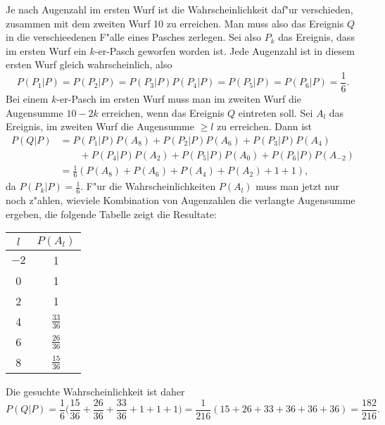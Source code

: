\begin{loesung}
\begin{teilaufgaben}
Je nach Augenzahl im ersten Wurf ist die Wahrscheinlichkeit
daf"ur verschieden, zusammen mit dem zweiten Wurf 10 zu erreichen.
Man muss also das Ereignis $Q$ in die verschieedenen F"alle eines
Pasches zerlegen. Sei also $P_k$ das Ereignis, dass im ersten Wurf
ein $k$-er-Pasch geworfen worden ist. Jede Augenzahl ist in diesem
ersten Wurf gleich wahrscheinlich, also
\[
P(P_1|P) = P(P_2|P) = P(P_3|P)
P(P_4|P) = P(P_5|P) = P(P_6|P)=\frac16.
\]
Bei einem $k$-er-Pasch im ersten Wurf muss man im zweiten Wurf die
Augensumme $10-2k$
erreichen, wenn das Ereignis $Q$ eintreten soll.
Sei $A_l$ das Ereignis, im zweiten Wurf die Augensumme $\ge l$
zu erreichen. Dann ist
\begin{align*}
P(Q|P)
&=P(P_1|P) P(A_8) + P(P_2|P) P(A_6) + P(P_3|P) P(A_4) \\
&\qquad + P(P_4|P)P(A_2) + P(P_5|P) P(A_0) + P(P_6|P) P(A_{-2})
\\
&=\frac1{6}(P(A_8) + P(A_6) + P(A_4) + P(A_2) + 1 + 1),
\end{align*}
da $P(P_k|P)=\frac1{6}$. F"ur die Wahrscheinlichkeiten $P(A_l)$ muss man
jetzt nur noch z"ahlen, wieviele Kombination von Augenzahlen die
verlangte Augensumme ergeben, die folgende Tabelle zeigt die
Resultate:
\begin{center}
\begin{tabular}{|c|c|}
\hline
$l$&$P(A_l)$\\
\hline
$-2$&1\\
0&1\\
2&1\\
4&$\frac{33}{36}$
\\
6&$\frac{26}{36}$
\\
8&$\frac{15}{36}$
\\
\hline
\end{tabular}
\end{center}
Die gesuchte Wahrscheinlichkeit ist daher
\[
P(Q|P)
=
\frac1{6}\biggl(\frac{15}{36} + \frac{26}{36} + \frac{33}{36} + 1 + 1 + 1\biggr)
=
\frac1{216}(15 + 26 + 33 + 36 + 36 + 36)
=
\frac{182}{216}.
\]


\end{teilaufgaben}
\end{loesung}
